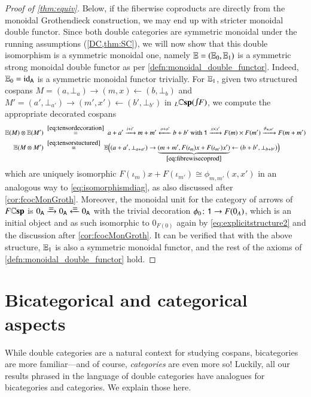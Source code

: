 \documentclass[reqno]{amsart}
\begin{document}
\begin{proof}[Proof of \cref{thm:equiv}]
{\chris Below, if the fiberwise coproducts are directly from the monoidal Grothendieck construction, we may end up with stricter monoidal double functor.}
Since both double categories are symmetric monoidal under the running assumptions (\cref{DC,thm:SC}), we will now show that this double isomorphism is a symmetric monoidal one, namely $\mathbf{\mathbb E}=(\mathbf{\mathbb E}_0,\mathbf{\mathbb E}_1)$ is a symmetric strong monoidal double functor as per \cref{defn:monoidal_double_functor}. Indeed, $\mathbf{\mathbb E}_0=\mathrm{id}_{\mathsf{A}}$ is a symmetric monoidal functor trivially. For $\mathbf{\mathbb E}_1$, given two structured cospans $M=(a,\bot_a)\to(m,x)\leftarrow(b,\bot_b)$ and $M'=(a',\bot_{a'})\to(m',x')\leftarrow(b',\bot_{b'})$ in $_L\lCsp(\inta F)$, we compute the appropriate decorated cospans
\begin{align*}
\lE(M)\ot\lE(M')&\;\stackrel{\cref{eq:tensordecoration}}{=}\;a+a'\xrightarrow{i+i'}m+m'\xleftarrow{o+o'}b+b' \textrm{ with }\one\xrightarrow{x\times x'}F(m)\times F(m')\xrightarrow{\phi_{m,m'}}F(m+m') \\
\lE(M\ot M')&\;\stackrel{\cref{eq:tensorstuctured}}{=}\;\lE\Big((a+a',\bot_{a+a'})\to\underbrace{(m+m',F(\iota_m)x+F(\iota_{m'})x')}_{\cref{eq:fibrewisecoprod}}\leftarrow(b+b',\bot_{b+b'})\Big)%
\end{align*}
which are uniquely isomorphic $F(\iota_m)x+F(\iota_{m'})\cong \phi_{m,m'}(x,x')$ in an analogous way to \cref{eq:isomorphismdiag}, as also discussed after \cref{cor:fcocMonGroth}.
Moreover, the monoidal unit for the category of arrows of $F\mathbf{\mathbb Csp}$ is $0_\A\xrightarrow{\raisebox{-3pt}[0pt][0pt]{$=$}}0_\A\xleftarrow{\raisebox{-3pt}[0pt][0pt]{$=$}}0_\A$ with the trivial decoration $\phi_0\colon \mathsf{1}\to F(0_A)$,
which is an initial object and as such isomorphic to $0_{F(0)}$
again by \cref{eq:explicitstructure2} and the discussion after \cref{cor:fcocMonGroth}.
It can be verified that with the above structure, $\mathbf{\mathbb E}_1$ is also a symmetric monoidal functor, and the rest of the axioms of \cref{defn:monoidal_double_functor} hold.
\end{proof}

\section{Bicategorical and categorical aspects}
\label{spinoffs}

While double categories are a natural context for studying cospans, bicategories are more 
familiar---and of course, \emph{categories} are even more so!   Luckily, all our results 
phrased in the language of double categories have analogues for bicategories and categories.  
We explain those here.
\end{document}
